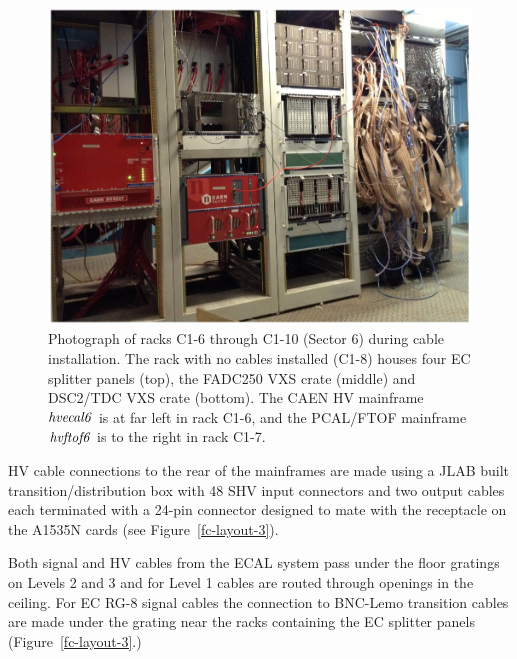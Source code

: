 \documentclass[letterpaper,10pt]{article}
\begin{document}
\begin{figure}[htbp]
  \centering
  \includegraphics[width= 5in, keepaspectratio = true]{Sector6-electronics}
  \vspace{2mm}
  \caption{Photograph of racks C1-6 through C1-10 (Sector 6) during cable installation.  The rack with no cables installed (C1-8)
  houses four EC splitter panels (top), the FADC250 VXS crate (middle) and DSC2/TDC VXS crate (bottom).  The CAEN HV mainframe $\it{hvecal6}$ is at far left in rack C1-6, and the PCAL/FTOF mainframe $\it{hvftof6}$ is to the right in rack C1-7.}
  \label{fc-layout-2} 
\end{figure}
HV cable connections to the rear of the mainframes are made using a JLAB built transition/distribution box with 48 SHV input connectors and two output cables each terminated with a 24-pin connector designed to mate with the receptacle on the A1535N cards (see Figure~\ref{fc-layout-3}).

Both signal and HV cables from the ECAL system pass under the floor gratings on Levels 2 and 3 and for Level 1
cables are routed through openings in the ceiling.  For EC RG-8 signal cables the connection to BNC-Lemo transition cables
are made under the grating near the racks containing the EC splitter panels (Figure~\ref{fc-layout-3}.)
\end{document}
